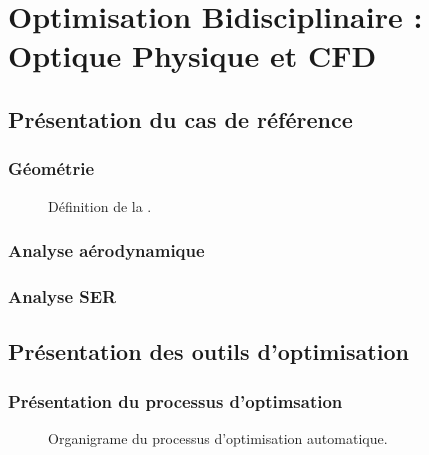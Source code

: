 \chapter{Optimisation Bidisciplinaire : Optique Physique et CFD}
\section[Présentation du cas de référence]{Présentation du cas de référence}
%

\lipsum
\subsection{Géométrie}
\lipsum

\begin{figure}[htp]
    \centering
    
    \caption{Définition de la \sref{}.}
    \label{fig:sref}
\end{figure}

\subsection{Analyse aérodynamique}
\lipsum
\subsection{Analyse SER}

\lipsum
\section[Présentation des outils d'optimisation]{Présentation des outils d'optimisation}
\lipsum
\subsection{Présentation du processus d'optimsation}
\lipsum

\begin{figure}[htp]
    \centering
    
    \caption{Organigrame du processus d'optimisation automatique.}
    \label{fig:optim-process}
\end{figure}

